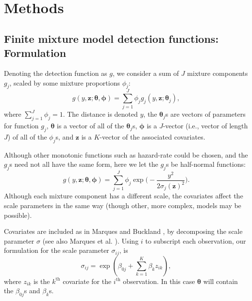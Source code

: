 \documentclass[10pt]{article}
\begin{document}
\section*{Methods}

\subsection*{Finite mixture model detection functions: Formulation}

Denoting the detection function as $g$, we consider a sum of $J$ mixture components $g_j$, scaled by some mixture proportions $\phi_j$:
\begin{equation*}
g(y,\mathbf{z}; \boldsymbol{\theta}, \boldsymbol{\phi}) = \sum_{j=1}^J \phi_j g_j(y,\mathbf{z}; \boldsymbol{\theta}_j),
\end{equation*}
where $\sum_{j=1}^J \phi_j = 1$. The distance is denoted $y$, the $\boldsymbol{\theta}_j$s are vectors of parameters for function $g_j$, $\boldsymbol{\theta}$ is a vector of all of the $\boldsymbol{\theta}_j$s, $\boldsymbol{\phi}$ is a $J$-vector (i.e., vector of length $J$) of all of the $\phi_j$s, and $\mathbf{z}$ is a $K$-vector of the associated covariates.  

Although other monotonic functions such as hazard-rate could be chosen, and the $g_j$s need not all have the same form, here we let the $g_j$s be half-normal functions:
\begin{equation*}
g(y,\mathbf{z}; \boldsymbol{\theta}, \boldsymbol{\phi}) = \sum_{j=1}^J \phi_j \exp \Big( - \frac{y^2}{2\sigma_j(\mathbf{z})^2} \Big).
\end{equation*}
Although each mixture component has a different scale, the covariates affect the scale parameters in the same way (though other, more complex, models may be possible).

Covariates are included as in Marques and Buckland \cite{Marques:2003vb}, by decomposing the scale parameter $\sigma$ (see also Marques et al. \cite{Marques:2007vm}).  Using $i$ to subscript each observation, our formulation for the scale parameter $\sigma_{ij}$, is
\begin{equation*}
\sigma_{ij} = \exp( \beta_{0j} + \sum_{k=1}^K \beta_k z_{ik}),
\end{equation*}
where $z_{ik}$ is the $k^\text{th}$ covariate for the $i^\text{th}$ observation. In this case $\boldsymbol{\theta}$ will contain the $\beta_{0j}$s and $\beta_k$s.
\end{document}
